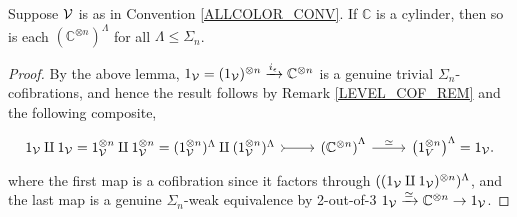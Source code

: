 \documentclass[a4paper,10pt
,draft
]{article}%
\renewcommand{\1}{\eta}%
\begin{document}
\begin{lemma}
      \label{ASSEM_HOM_LEM}
      Suppose $\mathcal V$ is as in Convention \ref{ALLCOLOR_CONV}. %
      If $\mathbb C$ is a cylinder, then so is each $\left(\mathbb C^{\otimes n}\right)^{\Lambda}$ for all $\Lambda \leq \Sigma_n$.
\end{lemma}
\begin{proof}
      By the above lemma,
      $1_{\mathcal V} = (1_{\mathcal V})^{\otimes n} \xrightarrow{i_\epsilon} \mathbb C^{\otimes n}$
      is a genuine trivial $\Sigma_n$-cofibrations,
      and hence the result follows by Remark \ref{LEVEL_COF_REM} and the following composite,
      \[
            \begin{tikzcd}
                  1_\V \amalg 1_\V
                  =
                  1_\V^{\otimes n} \amalg 1_\V^{\otimes n}
                  =
                  (1_\V^{\otimes n})^{\Lambda} \amalg (1_\V^{\otimes n})^{\Lambda}
                  \arrow[r, tail]
                  &
                  \left(\mathbb C^{\otimes n}\right)^\Lambda
                  \arrow[r, "\simeq"]
                  &
                  \left(1_V^{\otimes n}\right)^\Lambda = 1_\V.
            \end{tikzcd}
      \]
      where the first map is a cofibration since it factors through $((1_{\mathcal V} \amalg 1_{\mathcal V})^{\otimes n})^\Lambda$,
      and the last map is a genuine $\Sigma_n$-weak equivalence by 2-out-of-3 $1_{\mathcal V} \xrightarrow{\simeq} \mathbb C^{\otimes n} \to 1_{\mathcal V}$.


      

\end{proof}
\end{document}
